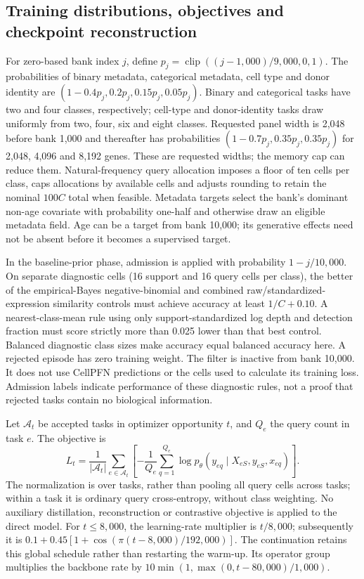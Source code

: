 \subsection*{Training distributions, objectives and checkpoint reconstruction}
\label{supp:training-details}
For zero-based bank index $j$, define $p_j=\operatorname{clip}((j-1,000)/9,000,0,1)$. The probabilities of binary metadata, categorical metadata, cell type and donor identity are $(1-0.4p_j,0.2p_j,0.15p_j,0.05p_j)$. Binary and categorical tasks have two and four classes, respectively; cell-type and donor-identity tasks draw uniformly from two, four, six and eight classes. Requested panel width is 2,048 before bank 1,000 and thereafter has probabilities $(1-0.7p_j,0.35p_j,0.35p_j)$ for 2,048, 4,096 and 8,192 genes. These are requested widths; the memory cap can reduce them. Natural-frequency query allocation imposes a floor of ten cells per class, caps allocations by available cells and adjusts rounding to retain the nominal $100C$ total when feasible. Metadata targets select the bank's dominant non-age covariate with probability one-half and otherwise draw an eligible metadata field. Age can be a target from bank 10,000; its generative effects need not be absent before it becomes a supervised target.

In the baseline-prior phase, admission is applied with probability $1-j/10,000$. On separate diagnostic cells (16 support and 16 query cells per class), the better of the empirical-Bayes negative-binomial and combined raw/standardized-expression similarity controls must achieve accuracy at least $1/C+0.10$. A nearest-class-mean rule using only support-standardized log depth and detection fraction must score strictly more than 0.025 lower than that best control. Balanced diagnostic class sizes make accuracy equal balanced accuracy here. A rejected episode has zero training weight. The filter is inactive from bank 10,000. It does not use CellPFN predictions or the cells used to calculate its training loss. Admission labels indicate performance of these diagnostic rules, not a proof that rejected tasks contain no biological information.

Let $\mathcal A_t$ be accepted tasks in optimizer opportunity $t$, and $Q_e$ the query count in task $e$. The objective is
\begin{equation}
 L_t=\frac{1}{|\mathcal A_t|}\sum_{e\in\mathcal A_t}
 \left[-\frac{1}{Q_e}\sum_{q=1}^{Q_e}\log p_\theta(y_{eq}\mid X_{eS},y_{eS},x_{eq})\right].
\end{equation}
The normalization is over tasks, rather than pooling all query cells across tasks; within a task it is ordinary query cross-entropy, without class weighting. No auxiliary distillation, reconstruction or contrastive objective is applied to the direct model. For $t\leq8,000$, the learning-rate multiplier is $t/8,000$; subsequently it is $0.1+0.45[1+\cos(\pi(t-8,000)/192,000)]$. The continuation retains this global schedule rather than restarting the warm-up. Its operator group multiplies the backbone rate by $10\min(1,\max(0,t-80,000)/1,000)$.

